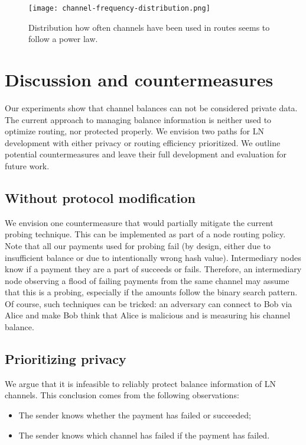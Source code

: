 \begin{figure}[]
	\centering
	\texttt{[image: channel-frequency-distribution.png]}
	\caption{Distribution how often channels have been used in routes seems to follow a power law.}
	\label{fig:channel-frequency-distribution}
\end{figure}





\section{Discussion and countermeasures} \label{sec:discussion}
Our experiments show that channel balances can not be considered private data.
The current approach to managing balance information is neither used to optimize routing, nor protected properly.
We envision two paths for LN development with either privacy or routing efficiency prioritized.
We outline potential countermeasures and leave their full development and evaluation for future work.

\subsection{Without protocol modification}
We envision one countermeasure that would partially mitigate the current probing technique.
This can be implemented as part of a node routing policy.
Note that all our payments used for probing fail (by design, either due to insufficient balance or due to intentionally wrong hash value). 
Intermediary nodes know if a payment they are a part of succeeds or fails.
Therefore, an intermediary node observing a flood of failing payments from the same channel may assume that this is a probing, especially if the amounts follow the binary search pattern.
Of course, such techniques can be tricked: an adversary can connect to Bob via Alice and make Bob think that Alice is malicious and is measuring his channel balance.


\subsection{Prioritizing privacy}
We argue that it is infeasible to reliably protect balance information of LN channels.
This conclusion comes from the following observations:
\begin{itemize}
	\item The sender knows whether the payment has failed or succeeded;
	\item The sender knows which channel has failed if the payment has failed.
\end{itemize}

